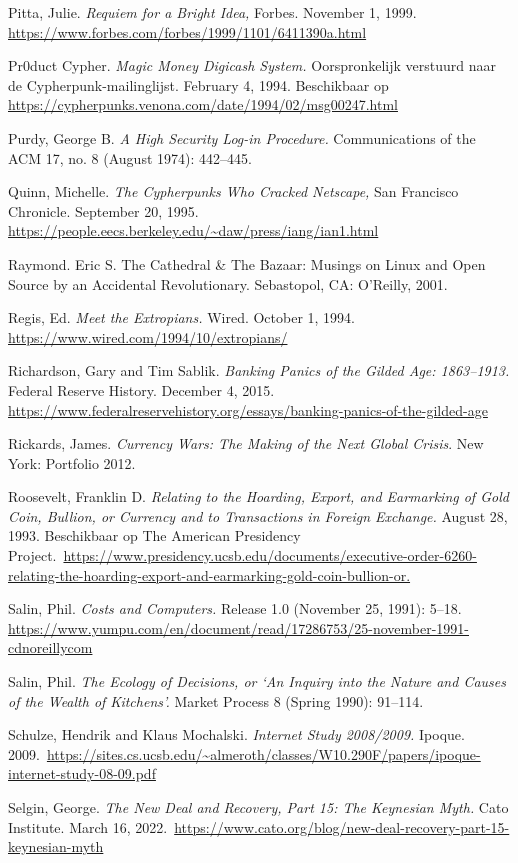 \documentclass[
  a5paper,
  smalldemyvopaper,11pt,twoside,onecolumn,openright,extrafontsizes,
hidelinks]{memoir}
\begin{document}
{Pitta, Julie. \emph{Requiem for a Bright Idea,} Forbes. November 1,
1999. \url{https://www.forbes.com/forbes/1999/1101/6411390a.html}

Pr0duct Cypher. \emph{Magic Money Digicash System.} Oorspronkelijk
verstuurd naar de Cypherpunk-mailinglijst. February 4, 1994. Beschikbaar
op \url{https://cypherpunks.venona.com/date/1994/02/msg00247.html}

Purdy, George B. \emph{A High Security Log-in Procedure.} Communications
of the ACM 17, no. 8 (August 1974): 442--445.

Quinn, Michelle. \emph{The Cypherpunks Who Cracked Netscape,} San
Francisco Chronicle. September 20, 1995.
\url{https://people.eecs.berkeley.edu/~daw/press/iang/ian1.html}

Raymond. Eric S. The Cathedral \& The Bazaar: Musings on Linux and Open
Source by an Accidental Revolutionary. Sebastopol, CA: O'Reilly, 2001.

Regis, Ed. \emph{Meet the Extropians.} Wired. October 1, 1994.
\url{https://www.wired.com/1994/10/extropians/}

Richardson, Gary and Tim Sablik. \emph{Banking Panics of the Gilded Age:
1863--1913.} Federal Reserve History. December 4, 2015.
\url{https://www.federalreservehistory.org/essays/banking-panics-of-the-gilded-age}

Rickards, James. \emph{Currency Wars: The Making of the Next Global
Crisis}. New York: Portfolio 2012.

Roosevelt, Franklin D. \emph{Relating to the Hoarding, Export, and
Earmarking of Gold Coin, Bullion, or Currency and to Transactions in
Foreign Exchange.} August 28, 1993. Beschikbaar op The American
Presidency
Project.~\url{https://www.presidency.ucsb.edu/documents/executive-order-6260-relating-the-hoarding-export-and-earmarking-gold-coin-bullion-or.}

Salin, Phil. \emph{Costs and Computers.} Release 1.0 (November 25,
1991): 5--18.
\url{https://www.yumpu.com/en/document/read/17286753/25-november-1991-cdnoreillycom}

Salin, Phil. \emph{The Ecology of Decisions, or `An Inquiry into the
Nature and Causes of the Wealth of Kitchens'.} Market Process 8 (Spring
1990): 91--114.

Schulze, Hendrik and Klaus Mochalski. \emph{Internet Study 2008/2009.}
Ipoque.
2009.~\url{https://sites.cs.ucsb.edu/~almeroth/classes/W10.290F/papers/ipoque-internet-study-08-09.pdf}

Selgin, George. \emph{The New Deal and Recovery, Part 15: The Keynesian
Myth.} Cato Institute. March 16,
2022.~\url{https://www.cato.org/blog/new-deal-recovery-part-15-keynesian-myth}

}
\end{document}
